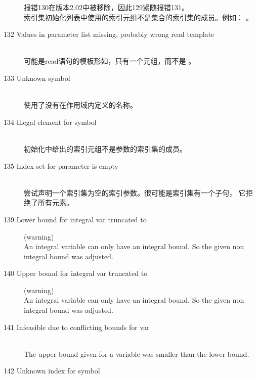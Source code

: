 \begin{description}
{     报错130在版本2.02中被移除，因此129紧随报错131。
   }\ \\
   索引集初始化列表中使用的索引元组不是集合的索引集的成员。例如：
   。
\item[132 Values in parameter list missing, probably wrong read
   template]\ \\
   可能是read语句的模板形如，只有一个元组，而不是
   。
\item[133 Unknown symbol \code{xxx}]\ \\
   使用了没有在作用域内定义的名称。
\item[134 Illegal element \code{xxx} for symbol]\ \\
   初始化中给出的索引元组不是参数的索引集的成员。
\item[135 Index set for parameter \code{xxx} is empty]\ \\
  尝试声明一个索引集为空的索引参数。很可能是索引集有一个子句，
  它拒绝了所有元素。
%
%
\item[139 Lower bound for integral var \code{xxx} truncated to
  \code{yyy}] (warning)\ \\
  An integral variable can only have an integral bound. So the given
  non integral bound was adjusted.
\item[140 Upper bound for integral var \code{xxx} truncated to
  \code{yyy}] (warning)\ \\
  An integral variable can only have an integral bound. So the given
  non integral bound was adjusted.
\item[141 Infeasible due to conflicting bounds for var \code{xxx}]\ \\
  The upper bound given for a variable was smaller than the lower bound.
\item[142 Unknown index \code{xxx} for symbol \code{yyy}]\ \\

\end{description}
